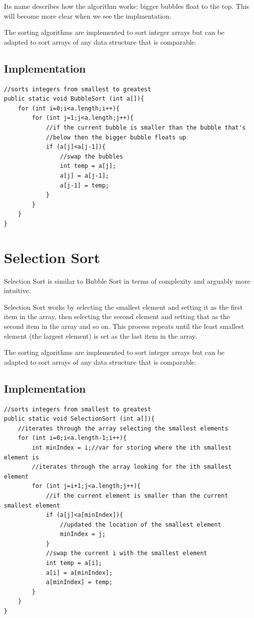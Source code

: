 \documentclass[11pt,oneside]{book}
\begin{document}
Its name describes how the algorithm works: bigger bubbles float to the top. This will become more clear when we see the implmentation.

The sorting algorithms are implemented to sort integer arrays but can be adapted to sort arrays of any data structure that is comparable.

\subsection{Implementation}

\begin{lstlisting}
//sorts integers from smallest to greatest
public static void BubbleSort (int a[]){
    for (int i=0;i<a.length;i++){
        for (int j=1;j<a.length;j++){
            //if the current bubble is smaller than the bubble that's 
            //below then the bigger bubble floats up
            if (a[j]<a[j-1]){
                //swap the bubbles
                int temp = a[j];
                a[j] = a[j-1];
                a[j-1] = temp;
            }
        }
    }
}
\end{lstlisting}

        \section{ Selection Sort }
        

Selection Sort is similar to Bubble Sort in terms of complexity and arguably more intuitive.

Selection Sort works by selecting the smallest element and setting it as the first item in the array, then selecting the second element and setting that as the second item in the array and so on. This process repeats until the least smallest element (the largest element) is set as the last item in the array.

The sorting algorithms are implemented to sort integer arrays but can be adapted to sort arrays of any data structure that is comparable.

\subsection{Implementation}

\begin{lstlisting}
//sorts integers from smallest to greatest
public static void SelectionSort (int a[]){
    //iterates through the array selecting the smallest elements
    for (int i=0;i<a.length-1;i++){
        int minIndex = i;//var for storing where the ith smallest element is
        //iterates through the array looking for the ith smallest element
        for (int j=i+1;j<a.length;j++){
            //if the current element is smaller than the current smallest element
            if (a[j]<a[minIndex]){
                //updated the location of the smallest element
                minIndex = j;
            }
            //swap the current i with the smallest element
            int temp = a[i];
            a[i] = a[minIndex];
            a[minIndex] = temp;
        }
    }
}
\end{lstlisting}
\end{document}
